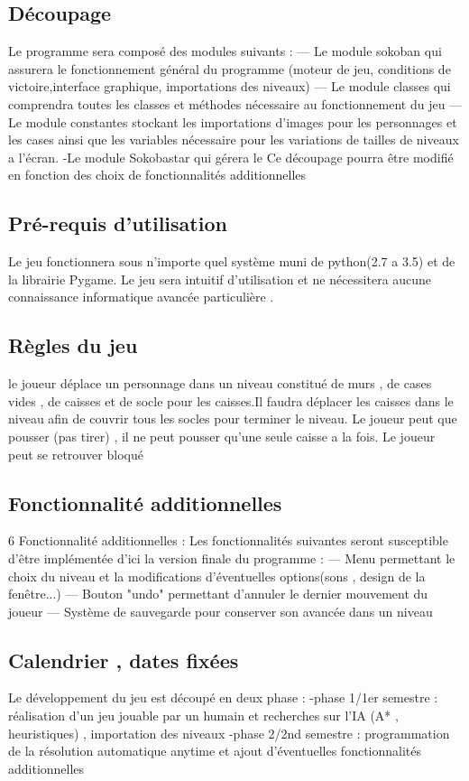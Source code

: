 \documentclass{article}
\begin{document}
		\subsection{Découpage}
		Le programme sera composé des modules suivants :
— Le module sokoban qui assurera le fonctionnement général du programme
(moteur de jeu, conditions de victoire,interface graphique, importations
des niveaux)
— Le module classes qui comprendra toutes les classes et méthodes nécessaire
au fonctionnement du jeu
— Le module constantes stockant les importations d’images pour les personnages
et les cases ainsi que les variables nécessaire pour les variations
de tailles de niveaux a l’écran.
-Le module Sokobastar qui gérera le 
Ce découpage pourra être modifié en fonction des choix de fonctionnalités additionnelles
		\subsection{Pré-requis d'utilisation}
		Le jeu fonctionnera sous n’importe quel système muni de python(2.7 a 3.5) et
de la librairie Pygame. Le jeu sera intuitif d’utilisation et ne nécessitera aucune
connaissance informatique avancée particulière .
		\subsection{Règles du jeu}
		le joueur déplace un personnage dans un niveau constitué de murs , de cases
vides , de caisses et de socle pour les caisses.Il faudra déplacer les caisses dans
le niveau afin de couvrir tous les socles pour terminer le niveau. Le joueur peut
que pousser (pas tirer) , il ne peut pousser qu’une seule caisse a la fois. Le joueur
peut se retrouver bloqué
		\subsection{Fonctionnalité additionnelles}
			6 Fonctionnalité additionnelles :
Les fonctionnalités suivantes seront susceptible d’être implémentée d’ici la
version finale du programme :
— Menu permettant le choix du niveau et la modifications d’éventuelles
options(sons , design de la fenêtre...)
— Bouton "undo" permettant d’annuler le dernier mouvement du joueur
— Système de sauvegarde pour conserver son avancée dans un niveau
		\subsection{Calendrier , dates fixées}
		Le développement du jeu est découpé en deux phase :
-phase 1/1er semestre : réalisation d’un jeu jouable par un humain et recherches
sur l’IA (A* , heuristiques) , importation des niveaux
-phase 2/2nd semestre : programmation de la résolution automatique anytime et ajout d'éventuelles fonctionnalités additionnelles
\end{document}
